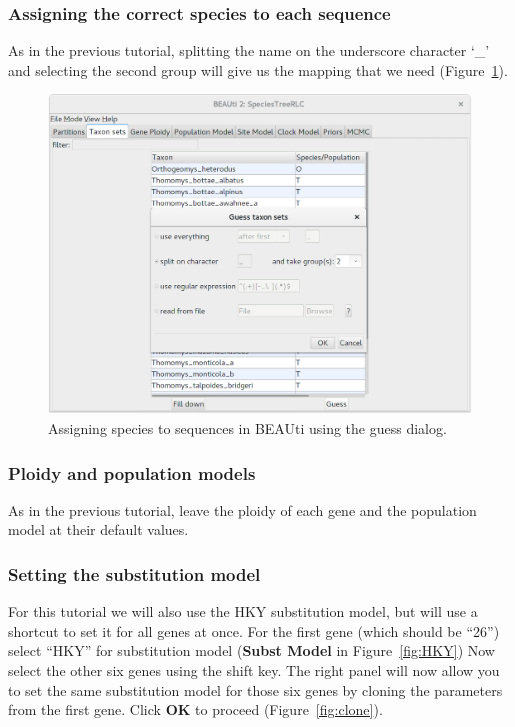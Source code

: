 \documentclass{article}
\begin{document}
\clearpage

\subsubsection*{Assigning the correct species to each sequence}

As in the previous tutorial, splitting the name on the underscore character
`\_' and selecting the second group will give us the mapping that we need
(Figure~\ref{fig:taxonSets}).

\begin{figure}[htb!]
\centering
\includegraphics[width=\textwidth]{figures/beauti-guess.png}
\caption{Assigning species to sequences in BEAUti using the guess dialog.}
\label{fig:taxonSets}
\end{figure}

\vspace{12pt}

\subsubsection*{Ploidy and population models}

As in the previous tutorial, leave the ploidy of each gene and the
population model at their default values.

\clearpage

\subsubsection*{Setting the substitution model}

For this tutorial we will also use the HKY substitution model, but will use a
shortcut to set it for all genes at once. For the first gene (which should be
``26'') select ``HKY'' for substitution model (\textbf{Subst Model} in
Figure~\ref{fig:HKY}) Now select the other six genes using the shift key. The
right panel will now allow you to set the same substitution model for
those six genes by cloning the parameters from the first gene. Click \textbf{OK}
to proceed (Figure~\ref{fig:clone}).
\end{document}

